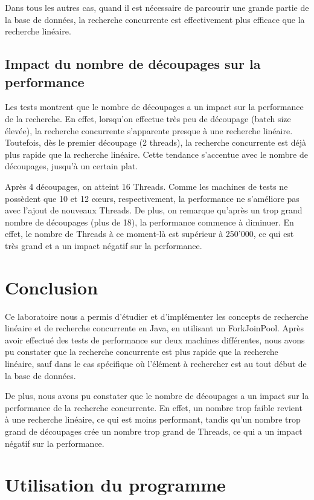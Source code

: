 \documentclass[
  french,
  a4paper,
]{scrartcl}
\begin{document}
Dans tous les autres cas, quand il est nécessaire de parcourir une grande partie de la base de données,
la recherche concurrente est effectivement plus efficace que la recherche linéaire.

\subsection{Impact du nombre de découpages sur la performance}

Les tests montrent que le nombre de découpages a un impact sur la performance de la recherche. 
En effet, lorsqu'on effectue très peu de découpage (batch size élevée), la recherche concurrente
s'apparente presque à une recherche linéaire. Toutefois, dès le premier découpage (2 threads), 
la recherche concurrente est déjà plus rapide que la recherche linéaire. Cette tendance 
s'accentue avec le nombre de découpages, jusqu'à un certain plat. 

Après 4 découpages, on atteint 16 Threads. Comme les machines de tests ne possèdent que 
10 et 12 cœurs, respectivement, la performance ne s'améliore pas avec l'ajout de nouveaux Threads. 
De plus, on remarque qu'après un trop grand nombre de découpages (plus de 18), la 
performance commence à diminuer. En effet, le nombre de Threads à ce moment-là est 
supérieur à 250'000, ce qui est très grand et a un impact négatif sur la performance.

\section{Conclusion}

Ce laboratoire nous a permis d'étudier et d'implémenter les concepts de recherche linéaire
et de recherche concurrente en Java, en utilisant un ForkJoinPool. 
Après avoir effectué des tests de performance sur deux machines différentes,
nous avons pu constater que la recherche concurrente est plus rapide que la recherche linéaire, 
sauf dans le cas spécifique où l'élément à rechercher est au tout début de la base de données. 

De plus, nous avons pu constater que le nombre de découpages a un impact sur la performance de la recherche
concurrente. En effet, un nombre trop faible revient à une recherche linéaire, ce qui est moins performant, 
tandis qu'un nombre trop grand de découpages crée un nombre trop grand de Threads, ce qui a un impact négatif
sur la performance. 

\clearpage
\appendix
\section{Utilisation du programme}
\end{document}
